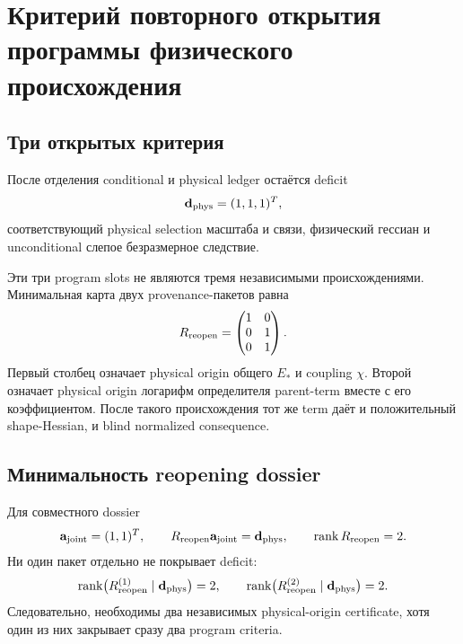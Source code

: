 \chapter{Критерий повторного открытия программы физического происхождения}
\label{ch:v9-physical-origin-reopening-criterion}

\section{Три открытых критерия}

После отделения conditional и physical ledger остаётся deficit
\begin{equation}
 \mathbf d_{\rm phys}=(1,1,1)^T,
 \label{eq:v9-reopening-deficit}
\end{equation}
соответствующий physical selection масштаба и связи, физический гессиан и
unconditional слепое безразмерное следствие.

Эти три program slots не являются тремя независимыми происхождениями.
Минимальная карта двух provenance-пакетов равна
\begin{equation}
 R_{\rm reopen}=
 \begin{pmatrix}
  1&0\\
  0&1\\
  0&1
 \end{pmatrix}.
 \label{eq:v9-reopening-map}
\end{equation}
Первый столбец означает physical origin общего $E_*$ и coupling $\chi$.
Второй означает physical origin логарифм определителя parent-term вместе с его
коэффициентом. После такого происхождения тот же term даёт и положительный
shape-Hessian, и blind normalized consequence.

\section{Минимальность reopening dossier}

Для совместного dossier
\begin{equation}
 \mathbf a_{\rm joint}=(1,1)^T,
 \qquad
 R_{\rm reopen}\mathbf a_{\rm joint}=\mathbf d_{\rm phys},
 \qquad
 \operatorname{rank} R_{\rm reopen}=2.
 \label{eq:v9-reopening-joint-closure}
\end{equation}
Ни один пакет отдельно не покрывает deficit:
\begin{equation}
 \operatorname{rank}\bigl(R_{\rm reopen}^{(1)}\mid\mathbf d_{\rm phys}\bigr)=2,
 \qquad
 \operatorname{rank}\bigl(R_{\rm reopen}^{(2)}\mid\mathbf d_{\rm phys}\bigr)=2.
 \label{eq:v9-reopening-single-package-no-go}
\end{equation}
Следовательно, необходимы два независимых physical-origin certificate,
хотя один из них закрывает сразу два program criteria.

